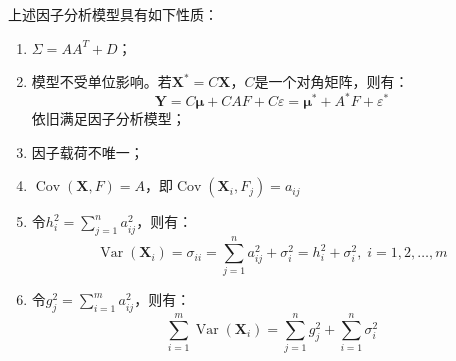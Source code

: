 \begin{property}\label{prop:FactorAnalysis}
	上述因子分析模型具有如下性质：
	\begin{enumerate}
		\item $\Sigma=AA^T+D$；
		\item 模型不受单位影响。若$\mathbf{X}^*=C\mathbf{X}$，$C$是一个对角矩阵，则有：
		\begin{equation*}
			\mathbf{Y}=C\boldsymbol{\mu}+CAF+C\varepsilon=\boldsymbol{\mu}^*+A^*F+\varepsilon^*
		\end{equation*}
		依旧满足因子分析模型；
		\item 因子载荷不唯一；
		\item $\operatorname{Cov}(\mathbf{X},F)=A$，即$\operatorname{Cov}(\mathbf{X}_i,F_j)=a_{ij}$
		\item 令$h_i^2=\sum\limits_{j=1}^{n}a_{ij}^2$，则有：
		\begin{equation*}
			\operatorname{Var}(\mathbf{X}_i)=\sigma_{ii}=\sum_{j=1}^{n}a_{ij}^2+\sigma_i^2=h_i^2+\sigma_i^2,\;i=1,2,\dots,m
		\end{equation*}
		\item 令$g_j^2=\sum\limits_{i=1}^{m}a_{ij}^2$，则有：
		\begin{equation*}
			\sum_{i=1}^{m}\operatorname{Var}(\mathbf{X}_i)=\sum_{j=1}^{n}g_j^2+\sum_{i=1}^{n}\sigma_i^2
		\end{equation*}
	\end{enumerate}
\end{property}
